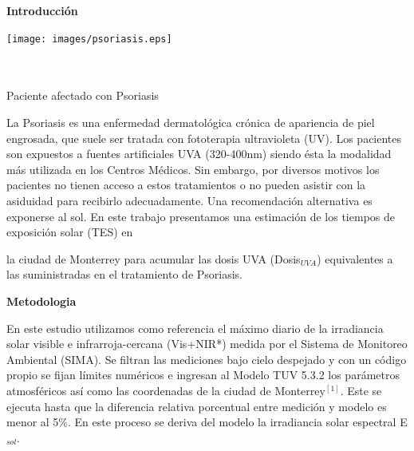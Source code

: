 \documentclass{article}
\begin{document}
\begin{multicols}{2}
\changefontsizes{13pt}
\begin{center}
\begin{shaded}
\textbf{\textcolor{na}{Introducción}}
\end{shaded}
\end{center}
\begin{minipage}{0.2\linewidth}
\hspace*{-1.3cm}
\texttt{[image: images/psoriasis.eps]}
\vspace{-0.6cm}\\
\changefontsizes{0.5pt}
\textcolor{white}{Cortesía:Centro \\Dermatológico Pascua}
\begin{center}
\changefontsizes{10pt}
\vspace{0.6cm}
\textcolor{na}{Paciente afectado con Psoriasis}
\end{center}
\end{minipage}
\hspace{-0.cm}
\begin{minipage}{0.76\linewidth}
La Psoriasis es una enfermedad dermatológica crónica de apariencia de piel engrosada, que suele ser tratada con fototerapia ultravioleta (UV). Los pacientes son expuestos a fuentes artificiales UVA (320-400nm) siendo ésta la modalidad más utilizada en los Centros Médicos. Sin embargo, por diversos motivos los pacientes no tienen acceso a estos tratamientos o no pueden asistir con la asiduidad para recibirlo adecuadamente. Una recomendación alternativa es exponerse al sol. En este trabajo presentamos una  estimación de los tiempos de  exposición solar (TES)  en
\end{minipage}
la ciudad de Monterrey para acumular las dosis UVA (Dosis$_{UVA}$) equivalentes a las suministradas en el tratamiento de Psoriasis.
\vspace{0.1cm}
\begin{center}
\begin{shaded}
\textbf{\textcolor{na}{Metodologia}}
\end{shaded}
\end{center}
\vspace{-0.3cm}
En este estudio utilizamos como referencia el máximo diario de la irradiancia solar visible e infrarroja-cercana (Vis+NIR*) medida por el Sistema de Monitoreo Ambiental (SIMA). Se filtran las mediciones bajo cielo despejado y con un código propio se fijan límites numéricos e ingresan al Modelo TUV 5.3.2 los parámetros atmosféricos así como las coordenadas de la ciudad de Monterrey$^{\left[1 \right]}$. Este se ejecuta hasta que la diferencia relativa porcentual entre medición y modelo es menor al 5\%. En este proceso se deriva del modelo la irradiancia solar espectral E$_{sol}$.

\end{multicols}
\end{document}
